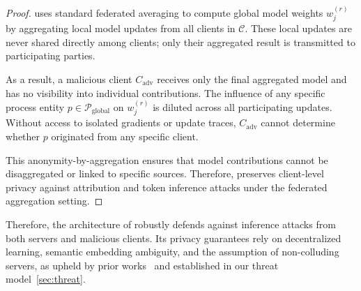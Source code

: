   \begin{proof}
  \Sys uses standard federated averaging to compute global model weights \(w_j^{(r)}\) by aggregating local model updates from all clients in \(\mathcal{C}\). These local updates are never shared directly among clients; only their aggregated result is transmitted to participating parties.
  
  As a result, a malicious client \(C_{\text{adv}}\) receives only the final aggregated model and has no visibility into individual contributions. The influence of any specific process entity \(p \in \mathcal{P}_{\text{global}}\) on \(w_j^{(r)}\) is diluted across all participating updates. Without access to isolated gradients or update traces, \(C_{\text{adv}}\) cannot determine whether \(p\) originated from any specific client.
  
  This anonymity-by-aggregation ensures that model contributions cannot be disaggregated or linked to specific sources. Therefore, \Sys preserves client-level privacy against attribution and token inference attacks under the federated aggregation setting.
  \end{proof}  

Therefore, the architecture of \Sys robustly defends against inference attacks from both servers and malicious clients. Its privacy guarantees rely on decentralized learning, semantic embedding ambiguity, and the assumption of non-colluding servers, as upheld by prior works~\cite{roy2020crypte,wu2022federated} and established in our threat model~\ref{sec:threat}.

